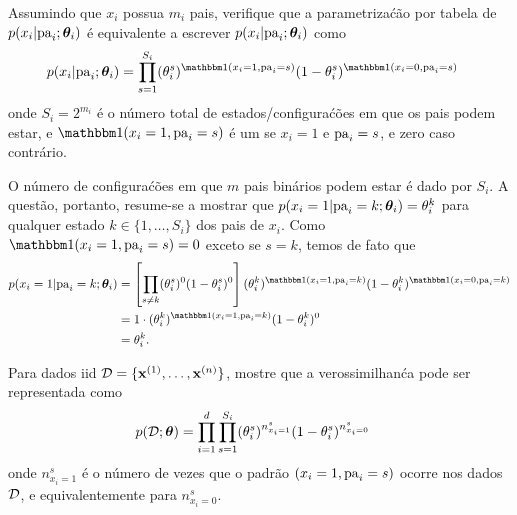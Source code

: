 \begin{exenumerate}
    
    \item Assumindo que $x_i$ possua $m_i$ pais, verifique que a parametriza\'c\~ao por tabela de $p(x_i | \mathrm{pa}_i; \boldsymbol{\theta}_i)$ \'e equivalente a escrever $p(x_i | \mathrm{pa}_i; \boldsymbol{\theta}_i)$ como
    \begin{align}
        p(x_i | \pa_i; \thetab_i) &= \prod_{s=1}^{S_i} (\theta_i^s)^{\ind(x_i=1, \pa_i=s)} (1-\theta_i^s)^{\ind(x_i=0, \pa_i=s)} \label{eq:pcond-fac-alt}
    \end{align}
    onde $S_i = 2^{m_i}$ \'e o n\'umero total de estados/configura\'c\~oes em que os
    pais podem estar, e $\ind(x_i=1, \pa_i=s)$ \'e um se $x_i=1$ e $\mathrm{pa}_i=s$, e zero caso contr\'ario.
    
    \begin{solution}
        O n\'umero de configura\'c\~oes em que $m$ pais bin\'arios podem estar \'e dado por $S_i$. A quest\~ao, portanto, resume-se a mostrar que $p(x_i=1 | \mathrm{pa}_i=k; \boldsymbol{\theta}_i) = \theta_i^k$ para qualquer estado $k \in \{1, \ldots, S_i\}$ dos pais de $x_i$. Como $\ind(x_i=1, \pa_i=s)=0$ exceto se $s=k$, temos de fato que
        \begin{align}
            p(x_i = 1| \pa_i = k; \thetab_i) &= \left[\prod_{s \neq k} (\theta_i^s)^0 (1-\theta_i^s)^0\right] (\theta_i^k)^{\ind(x_i=1, \pa_i=k)} (1-\theta_i^k)^{\ind(x_i=0, \pa_i=k)}\\
            &= 1 \cdot  (\theta_i^k)^{\ind(x_i=1, \pa_i=k)} (1-\theta_i^k)^0\\
            & = \theta_i^k.
        \end{align}
        
    \end{solution}
    
    \item Para dados iid $\mathcal{D} = \{\mathbf{x}^{(1)}, \ldots, \mathbf{x}^{(n)}\}$, mostre que a verossimilhan\'ca pode ser representada como
    \begin{align}
        p(\mathcal{D}; \boldsymbol{\theta}) & = \prod_{i=1}^d \prod_{s=1}^{S_i}  (\theta_i^s)^{n_{x_i=1}^s} (1-\theta_i^s)^{n_{x_i=0}^s} \label{eq:joint-dag-alt}
    \end{align}
    onde $n_{x_i=1}^s$ \'e o n\'umero de vezes que o padr\~ao $(x_i=1, \mathrm{pa}_i=s)$ ocorre nos dados $\mathcal{D}$, e equivalentemente para $n_{x_i=0}^s$.
    

\end{exenumerate}
